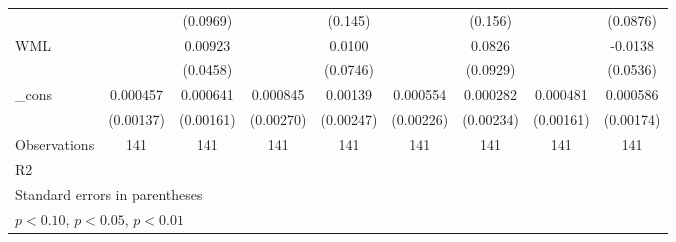 \begin{table}[htbp]
\begin{tabular}{l*{8}{c}}
                    &                     &    (0.0969)         &                     &     (0.145)         &                     &     (0.156)         &                     &    (0.0876)         \\
WML                 &                     &     0.00923         &                     &      0.0100         &                     &      0.0826         &                     &     -0.0138         \\
                    &                     &    (0.0458)         &                     &    (0.0746)         &                     &    (0.0929)         &                     &    (0.0536)         \\
\_cons              &    0.000457         &    0.000641         &    0.000845         &     0.00139         &    0.000554         &    0.000282         &    0.000481         &    0.000586         \\
                    &   (0.00137)         &   (0.00161)         &   (0.00270)         &   (0.00247)         &   (0.00226)         &   (0.00234)         &   (0.00161)         &   (0.00174)         \\
\hline
Observations        &         141         &         141         &         141         &         141         &         141         &         141         &         141         &         141         \\
R2                  &                     &                     &                     &                     &                     &                     &                     &                     \\
\hline\hline
\multicolumn{9}{l}{\footnotesize Standard errors in parentheses}\\
\multicolumn{9}{l}{\footnotesize \sym{*} \(p<0.10\), \sym{**} \(p<0.05\), \sym{***} \(p<0.01\)}\\
\end{tabular}
\end{table}
